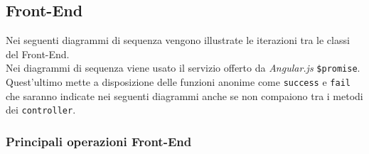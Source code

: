 \subsection{Front-End}
Nei seguenti diagrammi di sequenza vengono illustrate le iterazioni tra le classi del Front-End. \\
Nei diagrammi di sequenza viene usato il servizio offerto da \textit{Angular.js} \texttt{\$promise}. Quest'ultimo mette a disposizione delle funzioni anonime come \texttt{success} e \texttt{fail} che saranno indicate nei seguenti diagrammi anche se non compaiono tra i metodi dei \texttt{controller}.
\subsubsection{Principali operazioni Front-End}